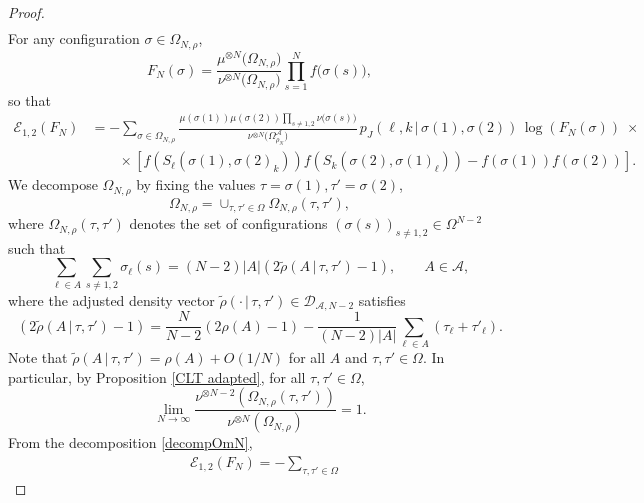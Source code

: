 \documentclass[10pt,a4paper]{amsart}
\let\O=\Omega
\let\r=\rho \let\s=\sigma \let\t=\tau
\let\si=\sigma
\let\t=\tau
\newcommand{\cA}{\ensuremath{\mathcal A}}
\newcommand{\cD}{\ensuremath{\mathcal D}}
\newcommand{\cE}{\ensuremath{\mathcal E}}
\newcommand{\cK}{\ensuremath{\mathcal K}}
\newcommand{\tc}{\,|\,}
\begin{document}
\begin{proof}
\begin{gather}
\end{gather}
For any configuration \(\sigma \in \Omega_{N,\r}\),
\[
F_N(\sigma) = \frac{\mu^{\otimes N}\big( \Omega_{N,\r} \big)}{\nu^{\otimes N}\big(\Omega_{N,\r} \big)} \prod_{s = 1}^N f\big( \sigma(s) \big),
\]
so that
\begin{align*}
\cE_{1,2}(F_N) 
&= -\sum_{\sigma \in \Omega_{N,\r}} \frac{\mu(\si(1))\mu(\si(2))\prod_{s \neq 1,2} \nu\big( \sigma(s) \big)}{\nu^{\otimes N}\big( \Omega_{\r_N}^{\mathcal{A}} \big)}\,
p_J(\ell,k\tc\si(1),\si(2))\,\log\left(F_N(\si) \right) \;\times
\\
&\qquad \times %
\left[ f( S_\ell( \sigma(1), \sigma(2)_k)) f( S_k( \sigma(2), \sigma(1)_\ell) ) - f( \sigma(1) ) f( \sigma(2) ) \right].
\end{align*}
We decompose $ \Omega_{N,\r}$ by fixing the values \(\t=\sigma(1), \t'=\sigma(2) \),
\begin{equation}\label{decompOmN}
 \Omega_{N,\r} = \cup_{\t,\t'\in \Omega} \Omega_{N,\r}( \t,\t'),
\end{equation}
where \(\Omega_{N,\r}( \t,\t')\) denotes the set of configurations \((\sigma(s))_{s \neq 1,2}\in\O^{N-2}\) such that
\[
\sum_{\ell \in A} \sum_{s \neq 1,2} \sigma_\ell(s)= 
(N - 2) |A| \left(2\widetilde{\r}(A\tc\t,\t')-1\right), \qquad A \in \mathcal{A},
\]
where the adjusted density vector \(\widetilde{\r}(\cdot\tc\t,\t')\in\cD_{\cA,N-2}\) satisfies 
\[
\left(2\widetilde{\r}(A\tc\t,\t')-1\right)= \frac{N}{N - 2}(2 \r(A)-1) -   \frac{1}{(N - 2) |A|} \sum_{\ell \in A} (\t_\ell + \t'_\ell)
.
\]
Note that $\widetilde{\r}(A\tc\t,\t') = \r(A) + O(1/N)$ for all $A$ and $\t,\t'\in\O$. In particular, by Proposition \ref{CLT adapted}, for all $\t,\t'\in\O$,
\begin{equation}\label{decompOmN1}
\lim_{N \to \infty} \frac{\nu^{\otimes {N-2}}( \Omega_{N,\r}( \t,\t'))}{\nu^{\otimes N}( \Omega_{N,\r})} = 1.
\end{equation}
From the decomposition \eqref{decompOmN}, 
\begin{align*}
&\cE_{1,2}(F_N) 
=-\sum_{\t,\t'\in\O}

\end{align*}
\end{proof}
\end{document}
